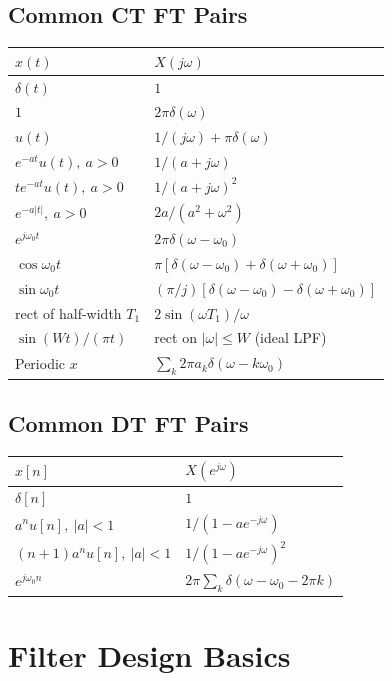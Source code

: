 \documentclass[11pt]{article}
\begin{document}
\subsection{Common CT FT Pairs}
\begin{center}
\begin{tabular}{|l|l|}
\hline
$x(t)$ & $X(j\omega)$\\
\hline
$\delta(t)$ & $1$\\
$1$ & $2\pi\delta(\omega)$\\
$u(t)$ & $1/(j\omega)+\pi\delta(\omega)$\\
$e^{-at}u(t),\ a>0$ & $1/(a+j\omega)$\\
$te^{-at}u(t),\ a>0$ & $1/(a+j\omega)^2$\\
$e^{-a|t|},\ a>0$ & $2a/(a^2+\omega^2)$\\
$e^{j\omega_0 t}$ & $2\pi\delta(\omega-\omega_0)$\\
$\cos\omega_0 t$ & $\pi[\delta(\omega-\omega_0)+\delta(\omega+\omega_0)]$\\
$\sin\omega_0 t$ & $(\pi/j)[\delta(\omega-\omega_0)-\delta(\omega+\omega_0)]$\\
rect of half-width $T_1$ & $2\sin(\omega T_1)/\omega$\\
$\sin(Wt)/(\pi t)$ & rect on $|\omega|\le W$ (ideal LPF)\\
Periodic $x$ & $\sum_k 2\pi a_k\delta(\omega-k\omega_0)$\\
\hline
\end{tabular}
\end{center}

\subsection{Common DT FT Pairs}
\begin{center}
\begin{tabular}{|l|l|}
\hline
$x[n]$ & $X(e^{j\omega})$\\
\hline
$\delta[n]$ & $1$\\
$a^n u[n],\ |a|<1$ & $1/(1-ae^{-j\omega})$\\
$(n+1)a^n u[n],\ |a|<1$ & $1/(1-ae^{-j\omega})^2$\\
$e^{j\omega_0 n}$ & $2\pi\sum_k\delta(\omega-\omega_0-2\pi k)$\\
\hline
\end{tabular}
\end{center}

\section{Filter Design Basics}
\end{document}
